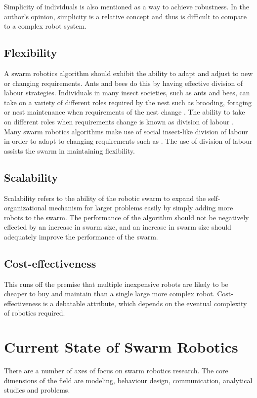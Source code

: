 Simplicity of individuals is also mentioned as a way to achieve robustness. In the author's opinion, simplicity is a relative concept and thus is difficult to compare to a complex robot system. 

\subsection{Flexibility}

A swarm robotics algorithm should exhibit the ability to adapt and adjust to new or changing requirements. Ants and bees do this by having effective division of labour strategies. Individuals in many insect societies, such as ants and bees, can take on a variety of different roles required by the nest such as brooding, foraging or nest maintenance when requirements of the nest change \cite{morley1946division}. The ability to take on different roles when requirements change is known as division of labour \cite{beshers2001models}. Many swarm robotics algorithms make use of social insect-like division of labour in order to adapt to changing requirements such as \cite{labella2006division, liu2007towards, gerkey2004formal}. The use of division of labour assists the swarm in maintaining flexibility.

\subsection{Scalability}
Scalability refers to the ability of the robotic swarm to expand the self-organizational mechanism for larger problems easily by simply adding more robots to the swarm. The performance of the algorithm should not be negatively effected by an increase in swarm size, and an increase in swarm size should adequately improve the performance of the swarm. 

\subsection{Cost-effectiveness}
This runs off the premise that multiple inexpensive robots are likely to be cheaper to buy and maintain than a single large more complex robot. Cost-effectiveness is a debatable attribute, which depends on the eventual complexity of robotics required. 



\section{Current State of Swarm Robotics}
There are a number of axes of focus on swarm robotics research. The core dimensions of the field are modeling, behaviour design, communication, analytical studies and problems.

